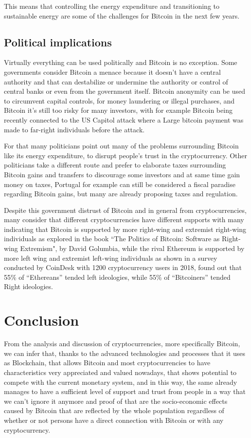 \documentclass{article}
\newcommand\tab[1][1cm]{\hspace*{#1}}
\begin{document}
This means that controlling the energy expenditure and transitioning to sustainable energy are some of the challenges for Bitcoin in the next few years.

\subsection{Political implications}

Virtually everything can be used politically and Bitcoin is no exception. Some governments consider Bitcoin a menace because it doesn't have a central authority and that can destabilize or undermine the authority or control of central banks or even from the government itself. Bitcoin anonymity can be used to circumvent capital controls, for money laundering or illegal purchases, and Bitcoin it’s still too risky for many investors, with for example Bitcoin being recently connected to the US Capitol attack where a Large bitcoin payment was made to far-right individuals before the attack.

For that many politicians point out many of the problems surrounding Bitcoin like its energy expenditure, to disrupt people's trust in the cryptocurrency. Other politicians take a different route and prefer to elaborate taxes surrounding Bitcoin gains and transfers to discourage some investors and at same time gain money on taxes, Portugal for example can still be considered a fiscal paradise regarding Bitcoin gains, but many are already proposing taxes and regulation.

Despite this government distrust of Bitcoin and in general from cryptocurrencies, many consider that different cryptocurrencies have different supports with many indicating that Bitcoin is supported by more right-wing and extremist right-wing individuals as explored in the book “The Politics of Bitcoin: Software as Right-wing Extremism", by David Golumbia, while the rival Ethereum is supported by more left wing and extremist left-wing individuals as shown in a survey conducted by CoinDesk with 1200 cryptocurrency users in 2018, found out that 55\% of “Ethereans” tended left ideologies, while 55\% of “Bitcoiners” tended Right ideologies.

\section{Conclusion}

\tab From the analysis and discussion of cryptocurrencies, more specifically Bitcoin, we can infer that, thanks to the advanced technologies and processes that it uses as Blockchain, that allows Bitcoin and most cryptocurrencies to have characteristics very appreciated and valued nowadays, that shows potential to compete with the current monetary system, and in this way, the same already manages to have a sufficient level of support and trust from people in a way that we can’t ignore it anymore and proof of that are the socio-economic effects caused by Bitcoin that are reflected by the whole population regardless of whether or not persons have a direct connection with Bitcoin or with any cryptocurrency.
\end{document}
